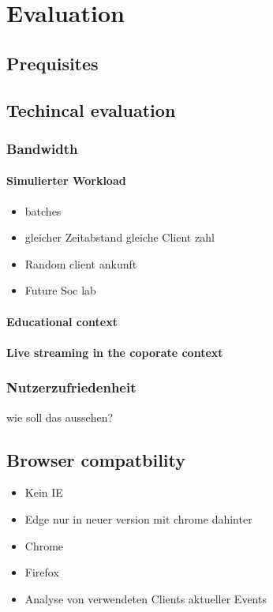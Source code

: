 \chapter{Evaluation}\label{ch:evaluation}

\section{Prequisites}

\section{Techincal evaluation}

\subsection{Bandwidth}

\subsubsection{Simulierter Workload}
\begin{itemize}
	\item batches
	\item gleicher Zeitabstand gleiche Client zahl
	\item Random client ankunft
	\item Future Soc lab
\end{itemize}
\subsubsection{Educational context}

\subsubsection{Live streaming in the coporate context}

\subsection{Nutzerzufriedenheit}
wie soll das aussehen?

\section{Browser compatbility}
\begin{itemize}
	\item Kein IE
	\item Edge nur in neuer version mit chrome dahinter
	\item Chrome
	\item Firefox
	\item Analyse von verwendeten Clients aktueller Events
\end{itemize}
